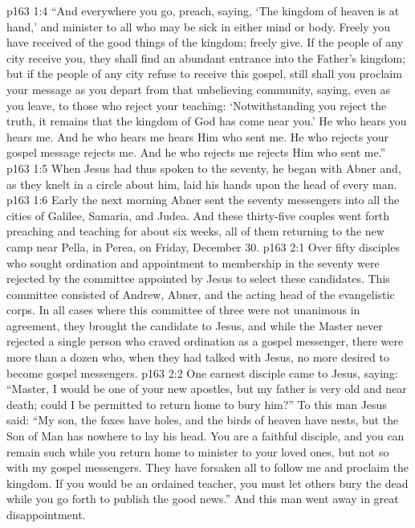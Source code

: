 \vs p163 1:4 \textcolor{ubdarkred}{“And everywhere you go, preach, saying, ‘The kingdom of heaven is at hand,’ and minister to all who may be sick in either mind or body. Freely you have received of the good things of the kingdom; freely give. If the people of any city receive you, they shall find an abundant entrance into the Father’s kingdom; but if the people of any city refuse to receive this gospel, still shall you proclaim your message as you depart from that unbelieving community, saying, even as you leave, to those who reject your teaching: ‘Notwithstanding you reject the truth, it remains that the kingdom of God has come near you.’ He who hears you hears me. And he who hears me hears Him who sent me. He who rejects your gospel message rejects me. And he who rejects me rejects Him who sent me.”}
\vs p163 1:5 When Jesus had thus spoken to the seventy, he began with Abner and, as they knelt in a circle about him, laid his hands upon the head of every man.
\vs p163 1:6 Early the next morning Abner sent the seventy messengers into all the cities of Galilee, Samaria, and Judea. And these thirty\hyp{}five couples went forth preaching and teaching for about six weeks, all of them returning to the new camp near Pella, in Perea, on Friday, December 30.
\vs p163 2:1 Over fifty disciples who sought ordination and appointment to membership in the seventy were rejected by the committee appointed by Jesus to select these candidates. This committee consisted of Andrew, Abner, and the acting head of the evangelistic corps. In all cases where this committee of three were not unanimous in agreement, they brought the candidate to Jesus, and while the Master never rejected a single person who craved ordination as a gospel messenger, there were more than a dozen who, when they had talked with Jesus, no more desired to become gospel messengers.
\vs p163 2:2 \pc One earnest disciple came to Jesus, saying: “Master, I would be one of your new apostles, but my father is very old and near death; could I be permitted to return home to bury him?” To this man Jesus said: \textcolor{ubdarkred}{“My son, the foxes have holes, and the birds of heaven have nests, but the Son of Man has nowhere to lay his head. You are a faithful disciple, and you can remain such while you return home to minister to your loved ones, but not so with my gospel messengers. They have forsaken all to follow me and proclaim the kingdom. If you would be an ordained teacher, you must let others bury the dead while you go forth to publish the good news.”} And this man went away in great disappointment.
